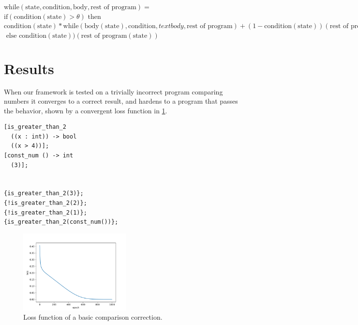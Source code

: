 \documentclass{article}
\begin{document}
\begin{center}
  $\text{while}(\text{state}, \text{condition}, \text{body}, \text{rest of program}) =$\\
  $\text{if}(\text{condition}(\text{state}) > \theta) \text{ then }$\\
  $\text{condition}(\text{state}) * \text{while}(\text{body}(\text{state}), \text{condition}, text{body}, \text{rest of program}) + (1 - \text{condition}(\text{state}))(\text{rest of program}(\text{state}))$\\
  $\text{ else } \text{condition}(\text{state}))(\text{rest of program}(\text{state}))$
\end{center}

\section{Results}
\begin{minipage}{\textwidth}
When our framework is tested on a trivially incorrect program comparing numbers it converges to a correct result, and hardens to a program that passes the behavior, shown by a convergent loss function in \ref{fig:trivial}.
\begin{verbatim}
[is_greater_than_2
  ((x : int)) -> bool
  ((x > 4))];
[const_num () -> int
  (3)];


{is_greater_than_2(3)};
{!is_greater_than_2(2)};
{!is_greater_than_2(1)};
{is_greater_than_2(const_num())};
\end{verbatim}
\end{minipage}
\begin{figure}[h!]
  \begin{center}
    \includegraphics[width=0.5\textwidth]{trivial.png}
  \end{center}
  \caption{Loss function of a basic comparison correction.}
  \label{fig:trivial}
\end{figure}
\end{document}
